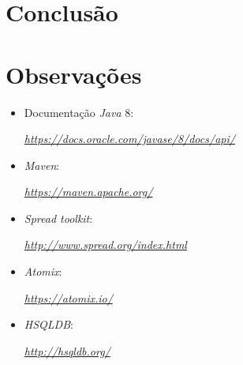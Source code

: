 \documentclass[a4paper]{report}
\begin{document}
\chapter{Conclusão} \label{ch:Conclusion}
\large{
	
}

\appendix
\chapter{Observações} \label{ch:Observations}
\begin{itemize}
    \item Documentação \textit{Java} 8:
    \par \textit{\url{https://docs.oracle.com/javase/8/docs/api/}}
	\item \textit{Maven}:
	\par \textit{\url{https://maven.apache.org/}}
	\item \textit{Spread toolkit}:
	\par \textit{\url{http://www.spread.org/index.html}}
	\item \textit{Atomix}:
	\par \textit{\url{https://atomix.io/}}
	\item \textit{HSQLDB}:
	\par \textit{\url{http://hsqldb.org/}}
\end{itemize}
\end{document}
